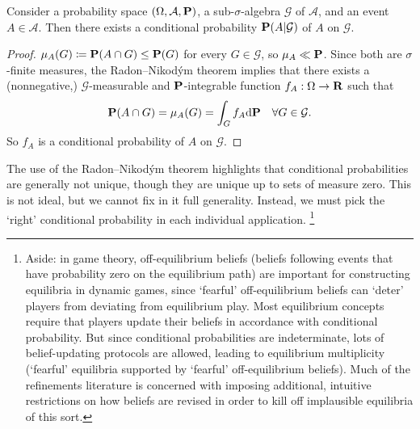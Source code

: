 \documentclass[11pt,letterpaper,reqno,oneside]{article}
\begin{document}
\begin{proposition}
	\label{eq:conditional_probability_existence}
	Consider a probability space $(\Omega,\mathcal{A},\mathbf{P})$, a sub-$\sigma$-algebra $\mathcal{G}$ of $\mathcal{A}$, and an event $A \in \mathcal{A}$. Then there exists a conditional probability $\mathbf{P}(A|\mathcal{G})$ of $A$ on $\mathcal{G}$.
\end{proposition}

\begin{proof}
	$\mu_A(G) \coloneqq \mathbf{P}(A \cap G) \leq \mathbf{P}(G)$ for every $G \in \mathcal{G}$, so $\mu_A \ll \mathbf{P}$. Since both are $\sigma$-finite measures, the Radon--Nikod\'{y}m theorem implies that there exists a (nonnegative,) $\mathcal{G}$-measurable and $\mathbf{P}$-integrable function $f_A : \Omega \to \mathbf{R}$ such that
	\begin{equation}
		\mathbf{P}(A \cap G)
		= \mu_A(G)
		= \int_G f_A \mathrm{d} \mathbf{P} 
		\quad\forall G \in \mathcal{G} .
		\label{eq:Radon-Nikodym_representation2}
	\end{equation}
	So $f_A$ is a conditional probability of $A$ on $\mathcal{G}$.
\end{proof}

The use of the Radon--Nikod\'{y}m theorem highlights that conditional probabilities are generally not unique, though they are unique up to sets of measure zero. This is not ideal, but we cannot fix in it full generality. Instead, we must pick the `right' conditional probability in each individual application.%
	\footnote{Aside: in game theory, off-equilibrium beliefs (beliefs following events that have probability zero on the equilibrium path) are important for constructing equilibria in dynamic games, since `fearful' off-equilibrium beliefs can `deter' players from deviating from equilibrium play. Most equilibrium concepts require that players update their beliefs in accordance with conditional probability. But since conditional probabilities are indeterminate, lots of belief-updating protocols are allowed, leading to equilibrium multiplicity (`fearful' equilibria supported by `fearful' off-equilibrium beliefs). Much of the refinements literature is concerned with imposing additional, intuitive restrictions on how beliefs are revised in order to kill off implausible equilibria of this sort.}
\end{document}

